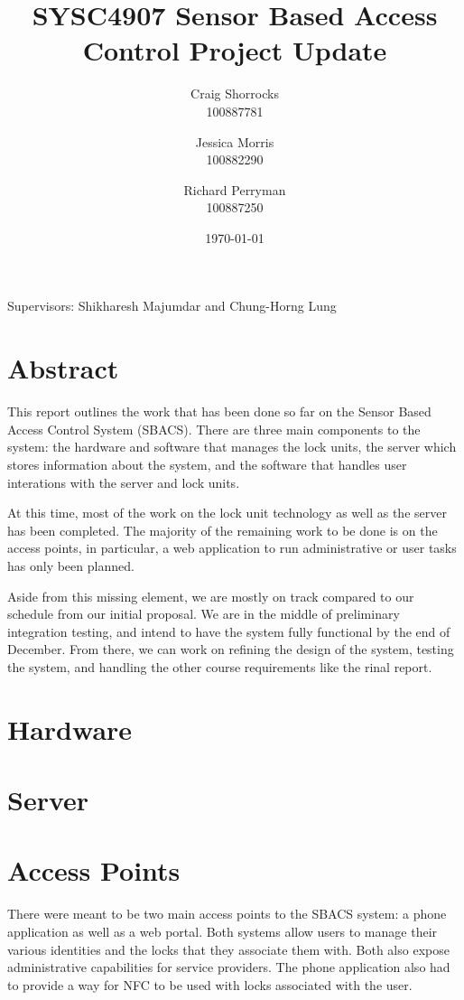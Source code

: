 \documentclass{article}
\title{SYSC4907 Sensor Based Access Control Project Update}
\author{
	Craig Shorrocks \\
	100887781
	\and
	Jessica Morris \\
	100882290
	\and
	Richard Perryman \\
	100887250
}
\date{\today}
\begin{document}
\maketitle

\begin{center}
Supervisors: Shikharesh Majumdar and Chung-Horng Lung
\end{center}

\pagebreak

\section{Abstract}

This report outlines the work that has been done so far on the Sensor Based Access Control System (SBACS). There are
three main components to the system: the hardware and software that manages the lock units, the server which stores
information about the system, and the software that handles user interations with the server and lock units.

At this time, most of the work on the lock unit technology as well as the server has been completed. The majority of the
remaining work to be done is on the access points, in particular, a web application to run administrative or user tasks
has only been planned.

Aside from this missing element, we are mostly on track compared to our schedule from our initial proposal. We are in
the middle of preliminary integration testing, and intend to have the system fully functional by the end of December.
From there, we can work on refining the design of the system, testing the system, and handling the other course
requirements like the rinal report.

\section{Hardware}

\section{Server}

\section{Access Points}

There were meant to be two main access points to the SBACS system: a phone application as well as a web portal. Both
systems allow users to manage their various identities and the locks that they associate them with. Both also expose
administrative capabilities for service providers. The phone application also had to provide a way for NFC to be used
with locks associated with the user.
\end{document}
